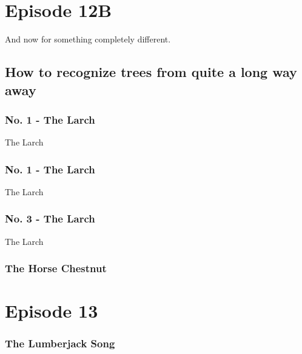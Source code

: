 \documentclass[10pt,a4paper]{article}
\begin{document}
\section{Episode 12B}
And now for something completely different.

\subsection{How to recognize trees from quite a long way away}

\subsubsection{No. 1 - The Larch}
The Larch

\subsubsection{No. 1 - The Larch}
The Larch

\subsubsection{No. 3 - The Larch}
The Larch

\subsubsection{The Horse Chestnut}

\section{Episode 13}

\subsubsection{The Lumberjack Song}
\end{document}
